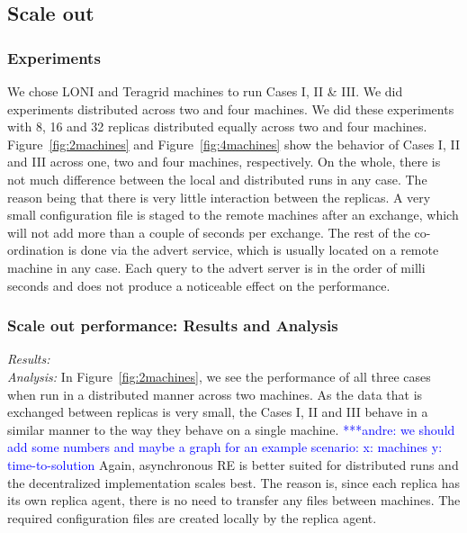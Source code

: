\documentclass{rspublic}
\newcommand{\alnote}[1]{ {\textcolor{blue} { ***andre: #1 }}}
\newcommand{\alnote}[1]{}
\begin{document}
\subsection{Scale out}
\subsubsection{Experiments}
We chose LONI and Teragrid machines to run Cases I, II \& III. We did experiments distributed across two and four machines. We did these experiments with 8, 16 and 32 replicas distributed equally across two and four machines. 
Figure~\ref{fig:2machines} and Figure~\ref{fig:4machines} show the behavior of Cases I, II and III across one, two and four machines, respectively. On the whole, there is not much difference between the local and distributed runs in any case. The reason being that there is very little interaction between the replicas. A very small configuration file is staged to the remote machines after an exchange, which will not add more than a couple of seconds per exchange. The rest of the co-ordination is done via the advert service, which is usually located on a remote machine in any case. Each query to the advert server is in the order of milli seconds and does not produce a noticeable effect on the performance. 

\subsubsection{Scale out performance: Results and Analysis}

{\it Results:}\\


{\it Analysis: } In Figure~\ref{fig:2machines}, we see the performance of all three cases when run in a distributed manner across two machines. As the data that is exchanged between replicas is very small, the Cases I, II and III behave in a similar manner to the way they behave on a single machine. \alnote{we should add some numbers and maybe a graph for an example scenario: x: machines y: time-to-solution} Again, asynchronous RE is better suited for distributed runs and the decentralized implementation scales best. The reason is, since each replica has its own replica agent, there is no need to transfer any files between machines. The required configuration files are created locally by the replica agent.
\end{document}
